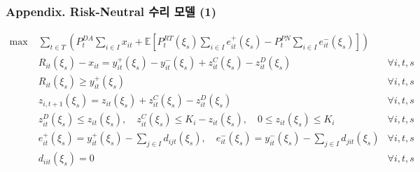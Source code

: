 \documentclass[xcolor=dvipsnames,t,9pt]{beamer}
\begin{document}
{
\begin{frame}[noframenumbering]
    \frametitle{Appendix. Risk-Neutral 수리 모델 (1)}
    \vspace{-1em}
    \footnotesize
    \begin{block}{}
        \vspace{-1em}
        \begin{subequations}
            \begin{flalign}
                \text{max} \;                     & \sum_{t \in T} \left(
                P_t^{DA} \sum_{i \in I} x_{it}
                + \mathbb{E}\left[
                P_t^{RT}(\xi_s) \sum_{i \in I} e^+_{it}(\xi_s)
                - P_t^{PN} \sum_{i \in I} e^-_{it}(\xi_s)
                \right]
                \right) \tag{1a}                                                                                                                                                        \\[0.5em]
                                                  & R_{it}(\xi_s) - x_{it} = y_{it}^{+}(\xi_s) - y_{it}^{-}(\xi_s) + z^C_{it}(\xi_s) - z^D_{it}(\xi_s) \quad & \forall i, t, s \tag{1b} \\
                                                  & R_{it}(\xi_s) \geq y^+_{it}(\xi_s) \quad                                                                 & \forall i, t, s \tag{1c} \\
                                                  & z_{i,t+1}(\xi_s) = z_{it}(\xi_s) + z^C_{it}(\xi_s) - z^D_{it}(\xi_s) \quad                               & \forall i, t, s \tag{1d} \\
                                                  & z^D_{it}(\xi_s) \le z_{it}(\xi_s), \quad
                z^C_{it}(\xi_s) \le K_i - z_{it}(\xi_s), \quad
                0 \le z_{it}(\xi_s) \le K_i \quad & \forall i, t, s \tag{1e}                                                                                                            \\
                                                  & e^+_{it}(\xi_s) = y^+_{it}(\xi_s) - \sum_{j \in I} d_{ijt}(\xi_s), \quad
                e^-_{it}(\xi_s) = y^-_{it}(\xi_s) - \sum_{j \in I} d_{jit}(\xi_s)
                                                  & \forall i, t, s \tag{1f}                                                                                                            \\
                                                  & d_{iit}(\xi_s) = 0
                                                  & \forall i, t, s \tag{1g}
            \end{flalign}
        \end{subequations}
    \end{block}


\end{frame}}
\end{document}
